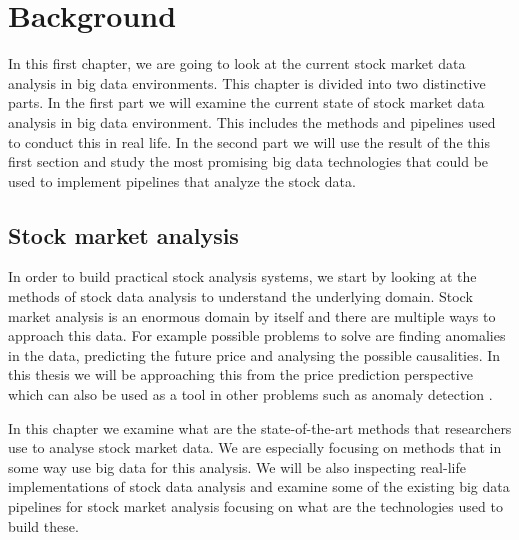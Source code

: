 \chapter{Background}
\label{chapter:background} 

In this first chapter, we are going to look at the current stock market data analysis in big data environments.
This chapter is divided into two distinctive parts.
In the first part we will examine the current state of stock market data analysis in big data environment.
This includes the methods and pipelines used to conduct this in real life.
In the second part we will use the result of the this first section and study the most promising big data technologies that could be used to implement pipelines that analyze the stock data.



\section{Stock market analysis}

In order to build practical stock analysis systems, we start by looking at the methods of stock data analysis to understand the underlying domain.
Stock market analysis is an enormous domain by itself and there are multiple ways to approach this data.
For example possible problems to solve are finding anomalies in the data, predicting the future price and analysing the possible causalities.
In this thesis we will be approaching this from the price prediction perspective which can also be used as a tool in other problems such as anomaly detection \cite{islam}.

In this chapter we examine what are the state-of-the-art methods that researchers use to analyse stock market data.
We are especially focusing on methods that in some way use big data for this analysis.
We will be also inspecting real-life implementations of stock data analysis and examine some of the existing big data pipelines for stock market analysis focusing on what are the technologies used to build these.

